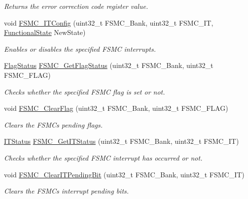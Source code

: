 \begin{DoxyCompactItemize}
\begin{DoxyCompactList}\small\item\em Returns the error correction code register value. \end{DoxyCompactList}\item 
void \mbox{\hyperlink{group___f_s_m_c___exported___functions_ga217027ae3cd213b9076b6a1be197064c}{F\+S\+M\+C\+\_\+\+I\+T\+Config}} (uint32\+\_\+t F\+S\+M\+C\+\_\+\+Bank, uint32\+\_\+t F\+S\+M\+C\+\_\+\+IT, \mbox{\hyperlink{group___exported__types_gac9a7e9a35d2513ec15c3b537aaa4fba1}{Functional\+State}} New\+State)
\begin{DoxyCompactList}\small\item\em Enables or disables the specified F\+S\+MC interrupts. \end{DoxyCompactList}\item 
\mbox{\hyperlink{group___exported__types_ga89136caac2e14c55151f527ac02daaff}{Flag\+Status}} \mbox{\hyperlink{group___f_s_m_c___exported___functions_gae00355115b078f483f0771057bb849c4}{F\+S\+M\+C\+\_\+\+Get\+Flag\+Status}} (uint32\+\_\+t F\+S\+M\+C\+\_\+\+Bank, uint32\+\_\+t F\+S\+M\+C\+\_\+\+F\+L\+AG)
\begin{DoxyCompactList}\small\item\em Checks whether the specified F\+S\+MC flag is set or not. \end{DoxyCompactList}\item 
void \mbox{\hyperlink{group___f_s_m_c___exported___functions_ga697618f2de0ad9a8a82461ddbebd5264}{F\+S\+M\+C\+\_\+\+Clear\+Flag}} (uint32\+\_\+t F\+S\+M\+C\+\_\+\+Bank, uint32\+\_\+t F\+S\+M\+C\+\_\+\+F\+L\+AG)
\begin{DoxyCompactList}\small\item\em Clears the F\+S\+MC\textquotesingle{}s pending flags. \end{DoxyCompactList}\item 
\mbox{\hyperlink{group___exported__types_gaacbd7ed539db0aacd973a0f6eca34074}{I\+T\+Status}} \mbox{\hyperlink{group___f_s_m_c___exported___functions_ga7fce9ca889d33cd8b8b7413875dd4d73}{F\+S\+M\+C\+\_\+\+Get\+I\+T\+Status}} (uint32\+\_\+t F\+S\+M\+C\+\_\+\+Bank, uint32\+\_\+t F\+S\+M\+C\+\_\+\+IT)
\begin{DoxyCompactList}\small\item\em Checks whether the specified F\+S\+MC interrupt has occurred or not. \end{DoxyCompactList}\item 
void \mbox{\hyperlink{group___f_s_m_c___exported___functions_gad9387e7674b8a376256a3378649e004e}{F\+S\+M\+C\+\_\+\+Clear\+I\+T\+Pending\+Bit}} (uint32\+\_\+t F\+S\+M\+C\+\_\+\+Bank, uint32\+\_\+t F\+S\+M\+C\+\_\+\+IT)
\begin{DoxyCompactList}\small\item\em Clears the F\+S\+MC\textquotesingle{}s interrupt pending bits. \end{DoxyCompactList}\end{DoxyCompactItemize}



